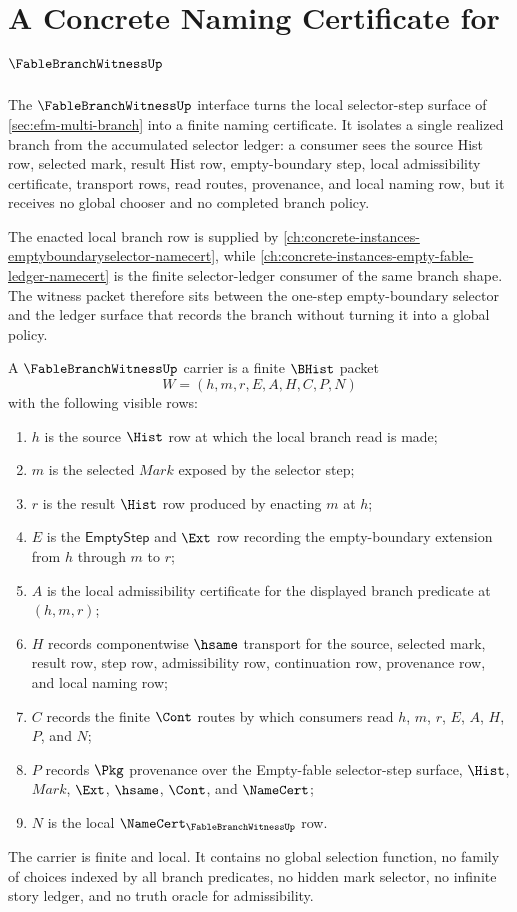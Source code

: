 \chapter{A Concrete Naming Certificate for $\FableBranchWitnessUp$}
\label{ch:concrete-instances-fablebranchwitness-namecert}

The $\FableBranchWitnessUp$ interface turns the local selector-step surface of \autoref{sec:efm-multi-branch} into a finite naming certificate. It isolates a single realized branch from the accumulated selector ledger: a consumer sees the source Hist row, selected mark, result Hist row, empty-boundary step, local admissibility certificate, transport rows, read routes, provenance, and local naming row, but it receives no global chooser and no completed branch policy.

The enacted local branch row is supplied by \autoref{ch:concrete-instances-emptyboundaryselector-namecert}, while \autoref{ch:concrete-instances-empty-fable-ledger-namecert} is the finite selector-ledger consumer of the same branch shape. The witness packet therefore sits between the one-step empty-boundary selector and the ledger surface that records the branch without turning it into a global policy.

\begin{definition}
\label{def:fable-branch-witness-carrier}
A $\FableBranchWitnessUp$ carrier is a finite $\BHist$ packet
$$
W=(h,m,r,E,A,H,C,P,N)
$$
with the following visible rows:
\begin{enumerate}
\item $h$ is the source $\Hist$ row at which the local branch read is made;
\item $m$ is the selected $\mathit{Mark}$ exposed by the selector step;
\item $r$ is the result $\Hist$ row produced by enacting $m$ at $h$;
\item $E$ is the $\mathsf{EmptyStep}$ and $\Ext$ row recording the empty-boundary extension from $h$ through $m$ to $r$;
\item $A$ is the local admissibility certificate for the displayed branch predicate at $(h,m,r)$;
\item $H$ records componentwise $\hsame$ transport for the source, selected mark, result row, step row, admissibility row, continuation row, provenance row, and local naming row;
\item $C$ records the finite $\Cont$ routes by which consumers read $h$, $m$, $r$, $E$, $A$, $H$, $P$, and $N$;
\item $P$ records $\Pkg$ provenance over the Empty-fable selector-step surface, $\Hist$, $\mathit{Mark}$, $\Ext$, $\hsame$, $\Cont$, and $\NameCert$;
\item $N$ is the local $\NameCert_{\FableBranchWitnessUp}$ row.
\end{enumerate}
The carrier is finite and local. It contains no global selection function, no family of choices indexed by all branch predicates, no hidden mark selector, no infinite story ledger, and no truth oracle for admissibility.
\end{definition}

